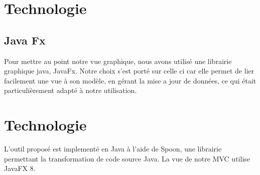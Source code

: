 \section{Technologie}
\subsection{Java Fx}
\par Pour mettre au point notre vue graphique, nous avons utilisé une librairie graphique java, JavaFx. Notre choix s'est porté sur celle ci car elle permet de lier facilement une vue à son modèle, en gérant la mise a jour de données, ce qui était particulièrement adapté à notre utilisation.\section{Technologie}

L'outil proposé est implementé en Java à l'aide de Spoon, une librairie permettant la transformation de code source Java. La vue de notre MVC utilise JavaFX 8.